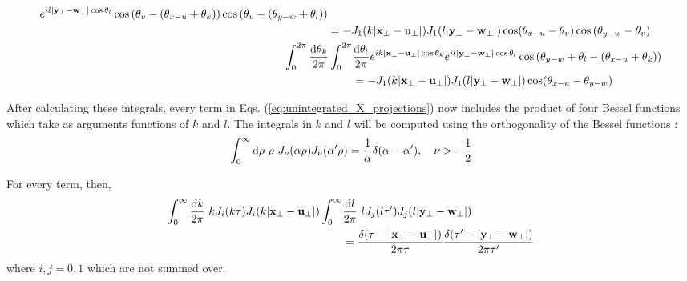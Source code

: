 \begin{subequations}
\begin{align}
\begin{split}
e^{i l |\mathbf{y}_\perp - \mathbf{w}_\perp| \cos{\theta_l}}\cos \left(\theta_v - (\theta_{x-u} + \theta_k) \right) \cos \left(\theta_v - (\theta_{y-w} + \theta_l) \right)
\\ & = 
- J_1(k |\mathbf{x}_\perp - \mathbf{u}_\perp|) J_1(l |\mathbf{y}_\perp - \mathbf{w}_\perp|) \cos(\theta_{x-u} - \theta_v) \cos \left( \theta_{y-w} - \theta_v \right)
\end{split} \\
\begin{split}
\int_{0}^{2\pi} \frac{\mathop{}\!\mathrm{d} \theta_k}{2 \pi} \int_{0}^{2\pi} & \frac{\mathop{}\!\mathrm{d} \theta_l}{2 \pi} 
e^{i k |\mathbf{x}_\perp - \mathbf{u}_\perp| \cos{\theta_k}}
e^{i l |\mathbf{y}_\perp - \mathbf{w}_\perp| \cos{\theta_l}}\cos \left( \theta_{y-w} + \theta_l - \left(\theta_{x-u} + \theta_k \right) \right)
\\ & = 
- J_1(k |\mathbf{x}_\perp - \mathbf{u}_\perp|) J_1(l |\mathbf{y}_\perp - \mathbf{w}_\perp|) \cos ( \theta_{x-u} - \theta_{y-w})
\end{split}
\end{align}
\end{subequations}


After calculating these integrals, every term in Eqs. (\ref{eq:unintegrated_X_projections}) now includes the product of four Bessel functions which take as arguments functions of $k$ and $l$. The integrals in $k$ and $l$ will be computed using the orthogonality of the Bessel functions \cite{arfken2005mathematical}:
\begin{equation}
\int_0^\infty \mathop{}\!\mathrm{d} \rho ~ \rho ~ J_\nu (\alpha \rho) J_\nu (\alpha' \rho) = \frac{1}{\alpha} \delta (\alpha - \alpha'), \quad \nu > -\frac{1}{2} 
\end{equation}

For every term, then,
\begin{equation}
\begin{split}
	\int_0^\infty \frac{\mathop{}\!\mathrm{d} k}{2 \pi} ~ k J_i (k \tau) J_i (k |\mathbf{x}_\perp - \mathbf{u}_\perp|) \int_0^\infty & \frac{\mathop{}\!\mathrm{d} l}{2 \pi} ~ l J_j (l \tau') J_j (l |\mathbf{y}_\perp - \mathbf{w}_\perp|) \\
 & = \frac{\delta(\tau - |\mathbf{x}_\perp - \mathbf{u}_\perp|)}{2 \pi \tau} \frac{\delta(\tau' - |\mathbf{y}_\perp - \mathbf{w}_\perp|)}{2 \pi \tau'}
\end{split}
\end{equation}
where $i,j = 0,1$ which are not summed over.

